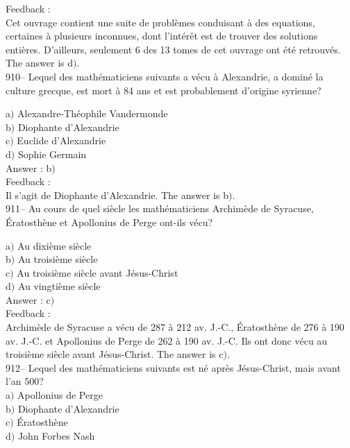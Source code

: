﻿\documentclass[letterpaper, 12pt]{article}
\begin{document}
Feedback : \\
Cet ouvrage contient une suite de probl\`emes conduisant \`a des
equations, certaines \`a plusieurs inconnues, dont l'int\'er\^et
est de trouver des solutions enti\`eres.
D'ailleurs, seulement 6 des 13 tomes de cet ouvrage ont \'et\'e retrouv\'es.
The answer is d$)$.\\

910-- Lequel des math\'ematiciens suivants a v\'ecu \`a Alexandrie,
a domin\'e la culture grecque, est mort \`a 84 ans et est
probablement d'origine syrienne?

a$)$ Alexandre-Th\'eophile Vandermonde \\
b$)$ Diophante d'Alexandrie \\
c$)$ Euclide d'Alexandrie \\
d$)$ Sophie Germain\\

Answer : b$)$\\

Feedback : \\
Il s'agit de Diophante d'Alexandrie. The answer is b$)$.\\

911-- Au cours de quel si\`ecle les math\'ematiciens Archim\`ede de
Syracuse, \'Eratosth\`ene et Apollonius de Perge ont-ils v\'ecu?

a$)$ Au dixi\`eme si\`ecle \\
b$)$ Au troisi\`eme si\`ecle \\
c$)$ Au troisi\`eme si\`ecle avant J\'esus-Christ \\
d$)$ Au vingti\`eme si\`ecle   \\

Answer : c$)$\\

Feedback : \\
Archim\`ede de Syracuse a v\'ecu de 287 \`a 212 av. J.-C.,
\'Eratosth\`ene de 276 \`a 190 av. J.-C. et Apollonius de Perge de 262 \`a
190 av. J.-C. Ils ont donc v\'ecu au troisi\`eme si\`ecle avant
J\'esus-Christ. The answer is c$)$.\\

912-- Lequel des math\'ematiciens suivants est n\'e apr\`es J\'esus-Christ,
mais avant l'an 500?\\

a$)$ Apollonius de Perge \\
b$)$ Diophante d'Alexandrie \\
c$)$ \'Eratosth\`ene \\
d$)$ John Forbes Nash  \\
\end{document}
